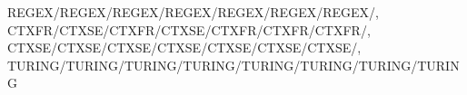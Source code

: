 REGEX/REGEX/REGEX/REGEX/REGEX/REGEX/REGEX/,
CTXFR/CTXSE/CTXFR/CTXSE/CTXFR/CTXFR/CTXFR/,
CTXSE/CTXSE/CTXSE/CTXSE/CTXSE/CTXSE/CTXSE/,
TURING/TURING/TURING/TURING/TURING/TURING/TURING/TURING